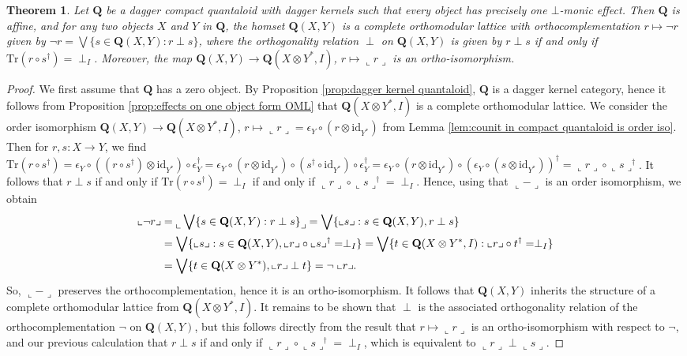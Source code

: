 \documentclass[12pt]{tac}
\newtheorem{theorem}{Theorem}[section]
\theoremstyle{definition}
\theoremstyle{remark}
\newcommand{\<}{\langle}
\renewcommand{\>}{\rangle}
\renewcommand{\:}{\colon}
\newcommand{\Tr}{\mathrm{Tr}}
\newcommand{\id}{\mathrm{id}}
\newcommand{\coname}[1]{\llcorner #1\lrcorner}
\begin{document}
\begin{theorem}\label{thm:dagger kernels imply orthomodularity}
    Let $\mathbf Q$ be a dagger compact quantaloid with dagger kernels such that every object has precisely one $\bot$-monic effect. Then $\mathbf Q$ is affine, and for any two objects $X$ and $Y$ in $\mathbf Q$, the homset $\mathbf Q(X,Y)$ is a complete orthomodular lattice with orthocomplementation $r\mapsto \neg r$ given by $\neg r=\bigvee\{s\in \mathbf Q(X,Y):r\perp s\}$, where the orthogonality relation $\perp$ on $\mathbf Q(X,Y)$ is given by $r\perp s$ if and only if $\Tr(r\circ s^\dag)=\perp_I$.  Moreover, the map $\mathbf Q(X,Y)\to\mathbf Q(X\otimes Y^*,I)$, $r\mapsto \coname {r}$ is an ortho-isomorphism.
\end{theorem}
\begin{proof}
We first assume that $\mathbf Q$ has a zero object. By Proposition \ref{prop:dagger kernel quantaloid}, $\mathbf Q$ is a dagger kernel category, hence it follows from 
Proposition \ref{prop:effects on one object form OML} that $\mathbf Q(X\otimes Y^*,I)$ is a complete orthomodular lattice. We consider the order isomorphism $\mathbf Q(X,Y)\to\mathbf Q(X\otimes Y^*,I)$, $r\mapsto\coname{r}=\epsilon_Y\circ(r\otimes \id_{Y^*})$ from Lemma \ref{lem:counit in compact quantaloid is order iso}. Then for $r,s:X\to Y$, we find
$\Tr(r\circ s^\dag)=\epsilon_Y\circ((r\circ s^\dag)\otimes \id_{Y^*})\circ\epsilon_Y^\dag=\epsilon_Y\circ(r\otimes\id_{Y^*})\circ(s^\dag\circ\id_{Y^*})\circ\epsilon_Y^\dag=\epsilon_Y\circ(r\otimes\id_{Y^*})\circ(\epsilon_Y\circ(s\otimes\id_{Y^*}))^\dag=\coname{r}\circ\coname{s}^\dag$. It follows that $r\perp s$ if and only if $\Tr(r\circ s^\dag)=\perp_I$ if and only if $\coname{r}\circ\coname{s}^\dag=\perp_I$. 
Hence, using that $\coname{-}$ is an order isomorphism, we obtain
\begin{align*}\coname{\neg r} & =\raisebox{-0.3em}{\(\llcorner\)}\bigvee\{s\in\mathbf Q(X, Y):r\perp s\}\raisebox{-0.3em}{\(\lrcorner\)} =\bigvee\{\coname{s}:s\in\mathbf Q(X,Y),r\perp s\}\\
& =\bigvee\{\coname{s}:s\in\mathbf Q(X,Y),\coname{r}\circ\coname{s}^\dag=\perp_I\} =\bigvee\{t\in\mathbf Q(X\otimes Y^*,I):\coname{r}\circ t^\dag=\perp_I\}\\
& = \bigvee\{t\in \mathbf Q(X\otimes Y^*),\coname{r}\perp t\} =\neg\phantom{.}{\coname{r}}.
\end{align*}
So, $\coname{-}$ preserves the orthocomplementation, hence it is an ortho-isomorphism. It follows that $\mathbf Q(X,Y)$ inherits the structure of a complete orthomodular lattice from $\mathbf Q(X\otimes Y^*,I)$. It remains to be shown that $\perp$ is the associated orthogonality relation of the orthocomplementation $\neg$ on $\mathbf Q(X,Y)$, but this follows directly from the result that $r\mapsto \coname{r}$ is an ortho-isomorphism with respect to $\neg$, and our previous calculation that $r\perp s$ if and only if $\coname{r}\circ\coname{s}^\dag=\perp_I$, which is equivalent to $\coname{r}\perp\coname{s}$. 


\end{proof}
\end{document}
